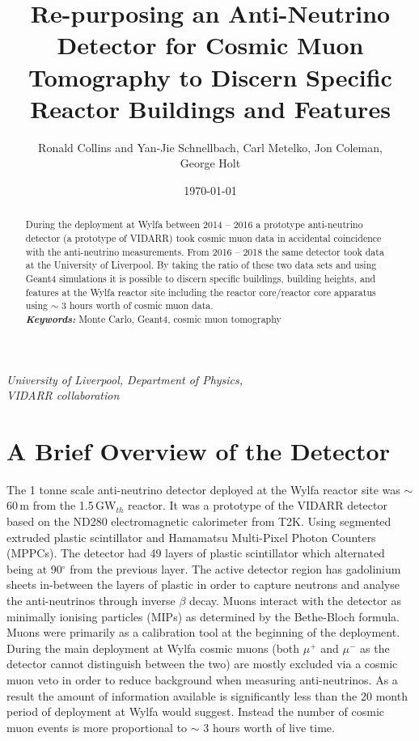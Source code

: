 \documentclass[12pt,a4paper]{article}
\title{Re-purposing an Anti-Neutrino Detector for Cosmic Muon Tomography to Discern Specific Reactor Buildings and Features}
\date{\today}
\author{Ronald Collins and Yan-Jie Schnellbach, Carl Metelko, Jon Coleman, \\George Holt}
\begin{document}
\maketitle


\begin{center}
\textit{University of Liverpool, Department of Physics,\\}
\textit{VIDARR collaboration\\}
\end{center}
 

\begin{abstract}
\normalsize During the deployment at Wylfa between 2014 -- 2016 a prototype anti-neutrino detector (a prototype of VIDARR) took cosmic muon data in accidental coincidence with the anti-neutrino measurements. From 2016 -- 2018 the same detector took data at the University of Liverpool. By taking the ratio of these two data sets and using Geant4 simulations it is possible to discern specific buildings, building heights, and features at the Wylfa reactor site including the reactor core/reactor core apparatus using $\sim$ 3 hours worth of cosmic muon data.\\

\providecommand{\keywords}[1]{\textbf{\textit{Keywords:}} #1} %
\keywords{Monte Carlo, Geant4, cosmic muon tomography}
\end{abstract}
\vspace{5mm} %



\section{A Brief Overview of the Detector}
The 1 tonne scale anti-neutrino detector deployed at the Wylfa reactor site was $\sim$ 60\,m from the 1.5\,GW$_{th}$ reactor. It was a prototype of the VIDARR detector based on the ND280 electromagnetic calorimeter from T2K. Using segmented extruded plastic scintillator and Hamamatsu Multi-Pixel Photon Counters (MPPCs). The detector had 49 layers of plastic scintillator which alternated being at 90$^\circ$ from the previous layer. The active detector region has gadolinium sheets in-between the layers of plastic in order to capture neutrons and analyse the anti-neutrinos through inverse $\beta$ decay. Muons interact with the detector as minimally ionising particles (MIPs) as determined by the Bethe-Bloch formula. Muons were primarily as a calibration tool at the beginning of the deployment\cite{Carroll_2018}. During the main deployment at Wylfa cosmic muons (both $\mu^+$ and $\mu^-$ as the detector cannot distinguish between the two) are mostly excluded via a cosmic muon veto in order to reduce background when measuring anti-neutrinos. As a result the amount of information available is significantly less than the 20 month period of deployment at Wylfa would suggest. Instead the number of cosmic muon events is more proportional to $\sim$ 3 hours worth of live time. 
 
\end{document}
